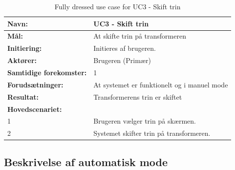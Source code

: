 \begin{table}[H]
	\centering
	
	\begin{threeparttable}
		\begin{tabularx}{\linewidth}{ l X }
			\toprule
			\bfseries{Navn:}				& UC3 - Skift trin  \\
			\midrule
			\bfseries{Mål:} 				& At skifte trin på transformeren \\
			\midrule
			\bfseries{Initiering:} 			& Initieres af brugeren. \\
			\midrule
			\bfseries{Aktører:} 			& Brugeren (Primær) \\
			\midrule
			\bfseries{Samtidige forekomster:} & 1 \\
			\midrule
			\bfseries{Forudsætninger:} 		& At systemet er funktionelt og i manuel mode\\
			\midrule
			\bfseries{Resultat:} 			& Transformerens trin er skiftet \\
			\midrule
			\bfseries{Hovedscenariet:} 	& \\
			
			
			1 	& Brugeren vælger trin på skærmen.\\
			2 	& Systemet skifter trin på transformeren.\\			
			
			\bottomrule
			
		\end{tabularx}
	\end{threeparttable}
	\caption{Fully dressed use case for UC3 - Skift trin}
	\label{table:UC3}
\end{table}


\subsection{Beskrivelse af automatisk mode}
